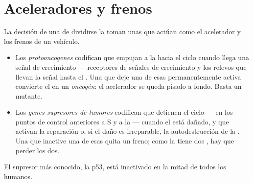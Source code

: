 \section{Aceleradores y frenos}

\begin{proposition}\label{prop:g11:cancer:genes}
La decisión de una  de dividirse la toman unas  que
actúan como el acelerador y los frenos de un vehículo.
\begin{itemize}
  \item Los \emph{protooncogenes} codifican
         que empujan a la  hacia el ciclo cuando llega
        una señal de crecimiento --- receptores de señales de
        crecimiento y los relevos que llevan la señal hasta el .
        Una  que deje una de esas  permanentemente
        activa convierte el  en un \emph{oncogén}: el acelerador se
        queda pisado a fondo. Basta un  mutante.
  \item Los \emph{genes supresores de tumores}
        codifican  que detienen el ciclo --- en los puntos de
        control anteriores a S y a la  --- cuando el  está
        dañado, y que activan la reparación o, si el daño es
        irreparable, la autodestrucción de la . Una  que
        inactive una de esas  quita un freno; como la 
        tiene dos , hay que perder los dos.
\end{itemize}
El supresor más conocido, la  p53, está inactivado en la mitad
de todos los  humanos.
\end{proposition}
\admitted

